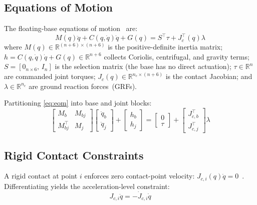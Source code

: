 \documentclass[journal]{IEEEtran}
\begin{document}
\subsection{Equations of Motion}

The floating-base equations of motion~\cite{righetti2011inverse} are:
\begin{equation}\label{eq:eom}
  M(q)\ddot{q} + C(q,\dot{q})\dot{q} + G(q) = S^\top\tau + J_c^\top(q)\lambda
\end{equation}
where $M(q)\in\mathbb{R}^{(n+6)\times(n+6)}$ is the positive-definite
inertia matrix; $h=C(q,\dot{q})\dot{q}+G(q)\in\mathbb{R}^{n+6}$ collects
Coriolis, centrifugal, and gravity terms; $S=[0_{n\times6},\,I_n]$ is the
selection matrix (the base has no direct actuation); $\tau\in\mathbb{R}^n$
are commanded joint torques; $J_c(q)\in\mathbb{R}^{n_c\times(n+6)}$ is the
contact Jacobian; and $\lambda\in\mathbb{R}^{n_c}$ are ground reaction
forces~(GRFs).

Partitioning \eqref{eq:eom} into base and joint blocks:
\begin{equation}\label{eq:partition}
  \begin{bmatrix}M_b & M_{bj} \\ M_{bj}^\top & M_j\end{bmatrix}
  \begin{bmatrix}\ddot{q}_b \\ \ddot{q}_j\end{bmatrix}
  +\begin{bmatrix}h_b \\ h_j\end{bmatrix}
  =\begin{bmatrix}0 \\ \tau\end{bmatrix}
  +\begin{bmatrix}J_{c,b}^\top \\ J_{c,j}^\top\end{bmatrix}\lambda
\end{equation}

\subsection{Rigid Contact Constraints}

A rigid contact at point $i$ enforces zero contact-point
velocity: $J_{c,i}(q)\dot{q}=0$~\cite{righetti2011inverse}.
Differentiating yields the acceleration-level constraint:
\begin{equation}\label{eq:contact_acc}
  J_{c,i}\ddot{q} = -\dot{J}_{c,i}\dot{q}
\end{equation}
\end{document}
